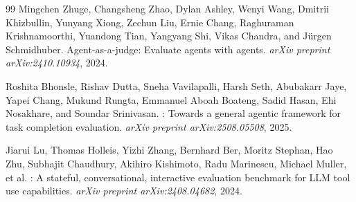 \begin{thebibliography}{99}
Mingchen Zhuge, Changsheng Zhao, Dylan Ashley, Wenyi Wang, Dmitrii Khizbullin, Yunyang Xiong, Zechun Liu, Ernie Chang, Raghuraman Krishnamoorthi, Yuandong Tian, Yangyang Shi, Vikas Chandra, and J{\"u}rgen Schmidhuber.
\newblock Agent-as-a-judge: Evaluate agents with agents.
\newblock \emph{arXiv preprint arXiv:2410.10934}, 2024.

Roshita Bhonsle, Rishav Dutta, Sneha Vavilapalli, Harsh Seth, Abubakarr Jaye, Yapei Chang, Mukund Rungta, Emmanuel Aboah Boateng, Sadid Hasan, Ehi Nosakhare, and Soundar Srinivasan.
: Towards a general agentic framework for task completion evaluation.
\newblock \emph{arXiv preprint arXiv:2508.05508}, 2025.

Jiarui Lu, Thomas Holleis, Yizhi Zhang, Bernhard Ber, Moritz Stephan, Hao Zhu, Subhajit Chaudhury, Akihiro Kishimoto, Radu Marinescu, Michael Muller, et al.
: A stateful, conversational, interactive evaluation benchmark for {LLM} tool use capabilities.
\newblock \emph{arXiv preprint arXiv:2408.04682}, 2024.

\end{thebibliography}
